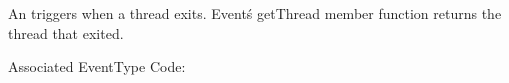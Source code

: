 
An  triggers when a thread exits. Event\'s getThread
member function returns the thread that exited.

Associated EventType Code: 
